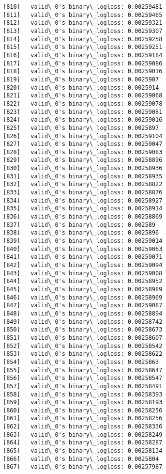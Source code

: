 \documentclass[11pt]{article}
\begin{document}
\begin{Verbatim}[commandchars=\\\{\}]
[810]	valid\_0's binary\_logloss: 0.00259481
[811]	valid\_0's binary\_logloss: 0.00259465
[812]	valid\_0's binary\_logloss: 0.00259321
[813]	valid\_0's binary\_logloss: 0.00259307
[814]	valid\_0's binary\_logloss: 0.00259258
[815]	valid\_0's binary\_logloss: 0.00259251
[816]	valid\_0's binary\_logloss: 0.00259184
[817]	valid\_0's binary\_logloss: 0.00259086
[818]	valid\_0's binary\_logloss: 0.00259016
[819]	valid\_0's binary\_logloss: 0.0025907
[820]	valid\_0's binary\_logloss: 0.0025914
[821]	valid\_0's binary\_logloss: 0.00259068
[822]	valid\_0's binary\_logloss: 0.00259078
[823]	valid\_0's binary\_logloss: 0.00259081
[824]	valid\_0's binary\_logloss: 0.00259016
[825]	valid\_0's binary\_logloss: 0.0025897
[826]	valid\_0's binary\_logloss: 0.00259104
[827]	valid\_0's binary\_logloss: 0.00259047
[828]	valid\_0's binary\_logloss: 0.00259083
[829]	valid\_0's binary\_logloss: 0.00258896
[830]	valid\_0's binary\_logloss: 0.00258936
[831]	valid\_0's binary\_logloss: 0.00258935
[832]	valid\_0's binary\_logloss: 0.00258822
[833]	valid\_0's binary\_logloss: 0.00258876
[834]	valid\_0's binary\_logloss: 0.00258927
[835]	valid\_0's binary\_logloss: 0.00258914
[836]	valid\_0's binary\_logloss: 0.00258869
[837]	valid\_0's binary\_logloss: 0.002589
[838]	valid\_0's binary\_logloss: 0.0025896
[839]	valid\_0's binary\_logloss: 0.00259014
[840]	valid\_0's binary\_logloss: 0.00259063
[841]	valid\_0's binary\_logloss: 0.00259071
[842]	valid\_0's binary\_logloss: 0.00259094
[843]	valid\_0's binary\_logloss: 0.00259008
[844]	valid\_0's binary\_logloss: 0.00258952
[845]	valid\_0's binary\_logloss: 0.00258989
[846]	valid\_0's binary\_logloss: 0.00258969
[847]	valid\_0's binary\_logloss: 0.00259087
[848]	valid\_0's binary\_logloss: 0.00258894
[849]	valid\_0's binary\_logloss: 0.00258742
[850]	valid\_0's binary\_logloss: 0.00258673
[851]	valid\_0's binary\_logloss: 0.00258607
[852]	valid\_0's binary\_logloss: 0.00258542
[853]	valid\_0's binary\_logloss: 0.00258622
[854]	valid\_0's binary\_logloss: 0.0025863
[855]	valid\_0's binary\_logloss: 0.00258647
[856]	valid\_0's binary\_logloss: 0.00258547
[857]	valid\_0's binary\_logloss: 0.00258491
[858]	valid\_0's binary\_logloss: 0.00258393
[859]	valid\_0's binary\_logloss: 0.00258193
[860]	valid\_0's binary\_logloss: 0.00258256
[861]	valid\_0's binary\_logloss: 0.00258256
[862]	valid\_0's binary\_logloss: 0.00258336
[863]	valid\_0's binary\_logloss: 0.00258249
[864]	valid\_0's binary\_logloss: 0.00258287
[865]	valid\_0's binary\_logloss: 0.00258134
[866]	valid\_0's binary\_logloss: 0.0025804
[867]	valid\_0's binary\_logloss: 0.00257987

\end{Verbatim}
\end{document}
